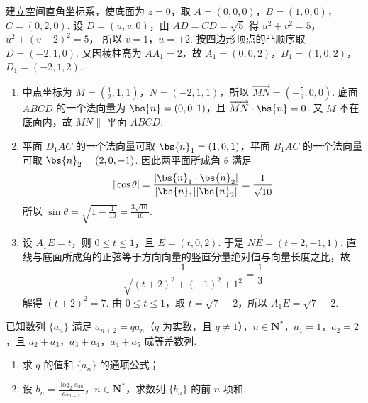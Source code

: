 \begin{solution}
建立空间直角坐标系，使底面为 \(z=0\)，取 \(A=(0,0,0)\)，\(B=(1,0,0)\)，\(C=(0,2,0)\). 设 \(D=(u,v,0)\)，由 \(AD=CD=\sqrt5\) 得
\(u^2+v^2=5\)，\(u^2+(v-2)^2=5\)，
所以 \(v=1\)，\(u=\pm2\). 按四边形顶点的凸顺序取 \(D=(-2,1,0)\). 又因棱柱高为 \(AA_1=2\)，故
\(A_1=(0,0,2)\)，\(B_1=(1,0,2)\)，\(D_1=(-2,1,2)\).
\begin{enumerate}
\item 中点坐标为 \(M=\left(\frac12,1,1\right)\)，\(N=(-2,1,1)\)，所以 \(\overrightarrow{MN}=\left(-\frac52,0,0\right)\). 底面 \(ABCD\) 的一个法向量为 \(\bs{n}=(0,0,1)\)，且 \(\overrightarrow{MN}\cdot\bs{n}=0\). 又 \(M\) 不在底面内，故 \(MN\parallel\) 平面 \(ABCD\).
\item 平面 \(D_1AC\) 的一个法向量可取 \(\bs{n}_1=(1,0,1)\)，平面 \(B_1AC\) 的一个法向量可取 \(\bs{n}_2=(2,0,-1)\). 因此两平面所成角 \(\theta\) 满足
\[
|\cos\theta|=\frac{|\bs{n}_1\cdot\bs{n}_2|}{|\bs{n}_1||\bs{n}_2|}=\frac1{\sqrt{10}}
\]
所以 \(\sin\theta=\sqrt{1-\frac1{10}}=\frac{3\sqrt{10}}{10}\).
\item 设 \(A_1E=t\)，则 \(0\leqslant t\leqslant1\)，且 \(E=(t,0,2)\). 于是 \(\overrightarrow{NE}=(t+2,-1,1)\). 直线与底面所成角的正弦等于方向向量的竖直分量绝对值与向量长度之比，故
\[
\frac{1}{\sqrt{(t+2)^2+(-1)^2+1^2}}=\frac13
\]
解得 \((t+2)^2=7\). 由 \(0\leqslant t\leqslant1\)，取 \(t=\sqrt7-2\)，所以 \(A_1E=\sqrt7-2\).
\end{enumerate}
\end{solution}

\begin{problem}
已知数列 \(\{a_{n}\}\) 满足 \(a_{n + 2} = qa_{n}\)（\(q\) 为实数，且 \(q \neq 1\)），\(n \in \mathbf{N}^{*}\)，\(a_{1} = 1\)，\(a_{2} = 2\)，且 \(a_{2} + a_{3}\)，\(a_{3} + a_{4}\)，\(a_{4} + a_{5}\) 成等差数列.

\begin{enumerate}
\item 求 \(q\) 的值和 \( \{a_{n}\} \) 的通项公式；
\item 设 \(b_{n}=\frac{\log_{2}a_{2n}}{a_{2n-1}}\)，\(n\in \mathbf{N}^{*}\)，求数列 \( \{b_{n}\} \) 的前 \(n\) 项和.
\end{enumerate}
\end{problem}

